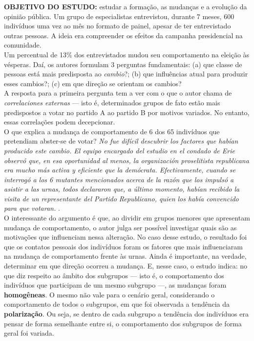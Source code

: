 \noindent \textbf{OBJETIVO DO ESTUDO:} estudar a formação, as mudanças e a evolução da opinião pública. Um grupo de especialistas entrevistou, durante 7 meses, 600 indivíduos uma vez ao mês no formato de painel, apesar de ter entrevistado outras pessoas. A ideia era compreender os efeitos da campanha presidencial na comunidade. \\

\noindent Um percentual de 13\% dos entrevistados mudou seu comportamento na eleição às vésperas. Daí, os autores formulam 3 perguntas fundamentais: (a) que classe de pessoas está mais predisposta ao \textit{cambio}?; (b) que influências atual para produzir esses cambios?; (c) em que direção se orientam os cambios? \\

\noindent A resposta para a primeira pergunta tem a ver com o que o autor chama de \textit{correlaciones externas} --- isto é, determinados grupos de fato estão mais predispostos a votar no partido A ao partido B por motivos variados. No entanto, essas correlações podem decepcionar. \\

\noindent O que explica a mudança de comportamento de 6 dos 65 indivíduos que pretendiam abster-se de votar? \textit{No fue difícil descubrir los factores que habían producido este cambio. El equipo encargado del estudio en el condado de Erie observó que, en esa oportunidad al menos, la organización proselitista republicana era mucho más activa y eficiente que la demócrata. Efectivamente, cuando se interrogó a los 6 mutantes mencionados acerca de la razón que los impulsó a asistir a las urnas, todos declararon que, a último momento, habían recibido la visita de un representante del Partido Republicano, quien los había convencido para que votaran.} \cite[~p. 4-5]{lazarsfeld_berelson_gaudet}. \\

\noindent O interessante do argumento é que, ao dividir em grupos menores que apresentam mudança de comportamento, o autor julga ser possível investigar quais são as motivações que influenciam nessa alteração. No caso desse estudo, o resultado foi que os contatos pessoais dos indivíduos foram os fatores que mais influenciaram na mudança de comportamento frente às urnas. Ainda é importante, na verdade, determinar em que direção ocorreu a mudança. E, nesse caso, o estudo indica: no que diz respeito ao âmbito dos subgrupos --- isto é, o comportamento dos indivíduos que participam de um mesmo subgrupo ---, as mudanças foram \textbf{homogêneas}. O mesmo não vale para o cenário geral, considerando o comportamento de todos o subgrupos, em que foi observada a tendência da \textbf{polarização}. Ou seja, se dentro de cada subgrupo a tendência dos indivíduos era pensar de forma semelhante entre si, o comportamento dos subgrupos de forma geral foi variada. \\


